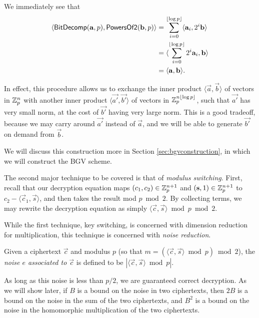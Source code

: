     We immediately see that
    \begin{align*}
    \langle {\sf BitDecomp}(\vec{a}, p), {\sf PowersOf2}(\vec{b}, p) \rangle &= \sum_{i = 0}^{\lfloor \log p \rfloor} \langle \vec{a}_i, 2^i \vec{b} \rangle \\
    &= \langle \sum_{i = 0}^{\lfloor \log p \rfloor} 2^i \vec{a}_i, \vec{b} \rangle \\
    &= \langle \vec{a}, \vec{b} \rangle.
    \end{align*}

    In effect, this procedure allows us to exchange the inner product $\langle \vec{a}, \vec{b} \rangle$ of vectors in $\Z_p^n$ with another inner product $\langle \vec{a'}, \vec{b'} \rangle$ of vectors in $\Z_p^{n \lfloor \log p \rfloor}$, such that $\vec{a'}$ has very small norm, at the cost of $\vec{b'}$ having very large norm. This is a good tradeoff, because we may carry around $\vec{a'}$ instead of $\vec{a}$, and we will be able to generate $\vec{b'}$ on demand from $\vec{b}$.

    We will discuss this construction more in Section \ref{sec:bgvconstruction}, in which we will construct the BGV scheme.

    The second major technique to be covered is that of \emph{modulus switching}. First, recall that our decryption equation maps $(c_1, c_2) \in \Z_p^{n+1}$ and $(\vec{s}, 1) \in \Z_p^{n+1}$ to $c_2 - \langle \vec{c}_1, \vec{s} \rangle$, and then takes the result mod $p \bmod 2$. By collecting terms, we may rewrite the decryption equation as simply $\langle \vec{c}, \vec{s} \rangle \bmod p \bmod 2$.

    While the first technique, key switching, is concerned with dimension reduction for multiplication, this technique is concerned with \emph{noise reduction}.
    \begin{definition}
        Given a ciphertext $\vec{c}$ and modulus $p$ (so that $m = (\langle \vec{c}, \vec{s} \rangle \bmod p) \bmod 2$), the \emph{noise $e$ associated to $\vec{c}$} is defined to be $\left| \langle \vec{c}, \vec{s} \rangle \bmod p \right|$.
    \end{definition}

    As long as this noise is less than $p / 2$, we are guaranteed correct decryption. As we will show later, if $B$ is a bound on the noise in two ciphertexts, then $2B$ is a bound on the noise in the sum of the two ciphertexts, and $B^2$ is a bound on the noise in the homomorphic multiplication of the two ciphertexts.


